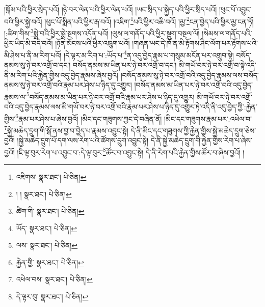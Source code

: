 །སྐོམ་པའི་ཕྱིར་སྲེད་པའོ། །ཉེ་བར་ལེན་པའི་ཕྱིར་ལེན་པའོ། །ཡང་སྲིད་པ་སྐྱེད་པའི་ཕྱིར་སྲིད་པའོ། །ཕུང་པོ་འབྱུང་བའི་ཕྱིར་སྐྱེ་བའོ། །ཕུང་པོ་སྨིན་པའི་ཕྱིར་རྒ་བའོ། །འཇིག་\footnote{འཇིགས་  སྣར་ཐང་།  པེ་ཅིན། }པའི་ཕྱིར་འཆི་བའོ། །མྱ་\footnote{། །  སྣར་ཐང་།  པེ་ཅིན། }ངན་བྱེད་པའི་ཕྱིར་མྱ་ངན་ཏོ། །:ཚིག་གིས་\footnote{ཚིག་གི་  སྣར་ཐང་།  པེ་ཅིན། }སྨྲེ་བའི་ཕྱིར་སྨྲེ་སྔགས་འདོན་པའོ། །ལུས་ལ་གནོད་པའི་ཕྱིར་སྡུག་བསྔལ་ལོ། །སེམས་ལ་གནོད་པའི་ཕྱིར་ཡིད་མི་བདེ་བའོ། །ཉོན་མོངས་པའི་ཕྱིར་འཁྲུག་པའོ། །གཞན་ཡང་དེ་ཁོ་ན་མི་རྟོགས་ཤིང་ལོག་པར་རྟོགས་པའི་མི་ཤེས་པ་ནི་མ་རིག་པའོ། །དེ་ལྟར་མ་རིག་པ་:ཡོད་པ་\footnote{ཡོད་  སྣར་ཐང་།  པེ་ཅིན། }ན་འདུ་བྱེད་རྣམ་པ་གསུམ་མངོན་པར་འགྲུབ་སྟེ། བསོད་ནམས་སུ་ཉེ་བར་འགྲོ་བ་དང་། བསོད་ནམས་མ་ཡིན་པར་ཉེ་བར་འགྲོ་བ་དང་། མི་གཡོ་བར་ཉེ་བར་འགྲོ་བ་སྟེ་འདི་ནི་མ་རིག་པའི་རྐྱེན་གྱིས་འདུ་བྱེད་རྣམས་ཞེས་བྱའོ། །བསོད་ནམས་སུ་ཉེ་བར་འགྲོ་བའི་འདུ་བྱེད་རྣམས་ལས་བསོད་ནམས་སུ་ཉེ་བར་འགྲོ་བའི་རྣམ་པར་ཤེས་པ་ཉིད་དུ་འགྱུར། །བསོད་ནམས་མ་ཡིན་པར་ཉེ་བར་འགྲོ་བའི་འདུ་བྱེད་རྣམས་ལ་\footnote{ལས་  སྣར་ཐང་།  པེ་ཅིན། }བསོད་ནམས་མ་ཡིན་པར་ཉེ་བར་འགྲོ་བའི་རྣམ་པར་ཤེས་པ་ཉིད་དུ་འགྱུར། མི་གཡོ་བར་ཉེ་བར་འགྲོ་བའི་འདུ་བྱེད་རྣམས་ལས་མི་གཡོ་བར་ཉེ་བར་འགྲོ་བའི་རྣམ་པར་ཤེས་པ་ཉིད་དུ་འགྱུར་ཏེ་འདི་ནི་འདུ་བྱེད་ཀྱི་:རྐྱེན་གྱིས་\footnote{རྐྱེན་གྱི་  སྣར་ཐང་།  པེ་ཅིན། }རྣམ་པར་ཤེས་པ་ཞེས་བྱའོ། །མིང་དང་གཟུགས་ཀྱང་དེ་བཞིན་ནོ། །མིང་དང་གཟུགས་རྣམ་པར་:འཕེལ་བ་\footnote{འཕེལ་བས་  སྣར་ཐང་།  པེ་ཅིན། }སྐྱེ་མཆེད་དྲུག་གི་སྒོ་ནས་བྱ་བ་བྱེད་པ་རྣམས་འབྱུང་སྟེ། དེ་ནི་མིང་དང་གཟུགས་ཀྱི་རྐྱེན་གྱིས་སྐྱེ་མཆེད་དྲུག་ཅེས་བྱའོ། །སྐྱེ་མཆེད་དྲུག་པོ་དག་ལས་རེག་པའི་ཚོགས་དྲུག་འབྱུང་སྟེ། དེ་ནི་སྐྱེ་མཆེད་དྲུག་གི་རྐྱེན་གྱིས་རེག་པ་ཞེས་བྱའོ། །ཇི་ལྟ་བུར་རེག་པ་འབྱུང་བ་:དེ་ལྟ་བུར་\footnote{དེ་ལྟར་བུ་  སྣར་ཐང་།  པེ་ཅིན། }ཚོར་བ་འབྱུང་སྟེ། དེ་ནི་རེག་པའི་རྐྱེན་གྱིས་ཚོར་བ་ཞེས་བྱའོ། །
